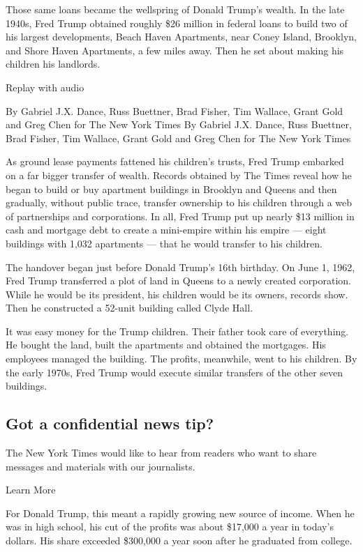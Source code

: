 Those same loans became the wellspring of Donald Trump's wealth. In the
late 1940s, Fred Trump obtained roughly \$26 million in federal loans to
build two of his largest developments, Beach Haven Apartments, near
Coney Island, Brooklyn, and Shore Haven Apartments, a few miles away.
Then he set about making his children his landlords.

Replay with audio

By Gabriel J.X. Dance, Russ Buettner, Brad Fisher, Tim Wallace, Grant
Gold and Greg Chen for The New York Times By Gabriel J.X. Dance, Russ
Buettner, Brad Fisher, Tim Wallace, Grant Gold and Greg Chen for The New
York Times

As ground lease payments fattened his children's trusts, Fred Trump
embarked on a far bigger transfer of wealth. Records obtained by The
Times reveal how he began to build or buy apartment buildings in
Brooklyn and Queens and then gradually, without public trace, transfer
ownership to his children through a web of partnerships and
corporations. In all, Fred Trump put up nearly \$13 million in cash and
mortgage debt to create a mini-empire within his empire --- eight
buildings with 1,032 apartments --- that he would transfer to his
children.

The handover began just before Donald Trump's 16th birthday. On June 1,
1962, Fred Trump transferred a plot of land in Queens to a newly created
corporation. While he would be its president, his children would be its
owners, records show. Then he constructed a 52-unit building called
Clyde Hall.

It was easy money for the Trump children. Their father took care of
everything. He bought the land, built the apartments and obtained the
mortgages. His employees managed the building. The profits, meanwhile,
went to his children. By the early 1970s, Fred Trump would execute
similar transfers of the other seven buildings.

\hypertarget{got-a-confidential-news-tip}{%
\subsection{Got a confidential news
tip?}\label{got-a-confidential-news-tip}}

The New York Times would like to hear from readers who want to share
messages and materials with our journalists.

Learn More

For Donald Trump, this meant a rapidly growing new source of income.
When he was in high school, his cut of the profits was about \$17,000 a
year in today's dollars. His share exceeded \$300,000 a year soon after
he graduated from college.

